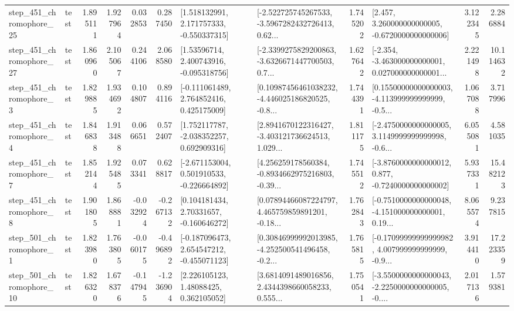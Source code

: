 \begin{tabular}{llrrrrllrlrr}
  step\_451\_chromophore\_25 &      test &      1.895111 &    1.927964 &      0.032853 &  0.287450 &    [1.518132991, 2.171757333, -0.550337315] &  [-2.522725745267533, -3.5967282432726413, 0.62... &       1.745202 &    [2.457, 3.260000000000005, -0.6720000000000006] &            3.122345 &          2.286884 \\
  step\_451\_chromophore\_27 &      test &      1.860960 &    2.105067 &      0.244106 &  2.068580 &     [1.53596714, 2.400743916, -0.095318756] &  [-2.3399275829200863, -3.6326671447700503, 0.7... &       1.627642 &  [-2.354, -3.463000000000001, 0.027000000000001... &            2.221498 &         10.114632 \\
   step\_451\_chromophore\_3 &      test &      1.829885 &    1.934692 &      0.104807 &  0.894116 &    [-0.111061489, 2.764852416, 0.425175009] &  [0.10987456461038232, -4.446025186820525, -0.8... &       1.744391 &  [0.15500000000000003, -4.113999999999999, -0.5... &            1.067088 &          3.717996 \\
   step\_451\_chromophore\_4 &      test &      1.846838 &    1.913488 &      0.066651 &  0.572407 &    [1.752117787, -2.038352257, 0.692909316] &  [2.8941670122316427, -3.403121736624513, 1.029... &       1.811175 &  [-2.4750000000000005, 3.1149999999999998, -0.6... &            6.055081 &          4.581035 \\
   step\_451\_chromophore\_7 &      test &      1.852144 &    1.925485 &      0.073341 &  0.628817 &   [-2.671153004, 0.501910533, -0.226664892] &  [4.256259178560384, -0.8934662975216803, -0.39... &       1.745512 &  [-3.8760000000000012, 0.877, -0.7240000000000002] &            5.937331 &         15.482123 \\
   step\_451\_chromophore\_8 &      test &      1.901805 &    1.868881 &     -0.032924 & -0.267132 &     [0.104181434, 2.70331657, -0.160646272] &  [0.07894466087224797, 4.465759859891201, -0.18... &       1.762843 &  [-0.7510000000000048, -4.151000000000001, 0.19... &            8.065574 &          9.237815 \\
   step\_501\_chromophore\_1 &      test &      1.823980 &    1.763805 &     -0.060175 & -0.496892 &   [-0.187096473, 2.654547212, -0.455071123] &  [0.30846999992013985, -4.252500541496458, -0.2... &       1.765815 &  [-0.17099999999999982, 4.007999999999999, -0.9... &            3.914410 &         17.223359 \\
  step\_501\_chromophore\_10 &      test &      1.826320 &    1.678376 &     -0.147945 & -1.236904 &      [2.226105123, 1.48088425, 0.362105052] &  [3.6814091489016856, 2.4344398660058233, 0.555... &       1.750541 &  [-3.5500000000000043, -2.2250000000000005, -0.... &            2.017136 &          1.579381 \\

\end{tabular}
